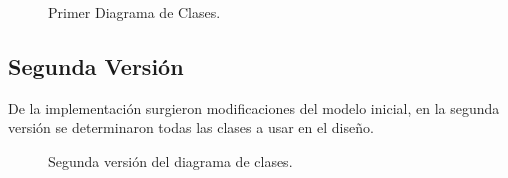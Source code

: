 \documentclass[12pt]{article} %
\begin{document}
\begin{figure}[H] %
\caption{Primer Diagrama de Clases.}
\label{fig:speciation}
\end{figure}

\subsection{Segunda Versión}
De la implementación surgieron modificaciones del modelo inicial, en la segunda versión se determinaron todas las clases a usar en el diseño.

\begin{figure}[H] %
\caption{Segunda versión del diagrama de clases.}
\label{fig:DC_v2}
\end{figure}
\end{document}
